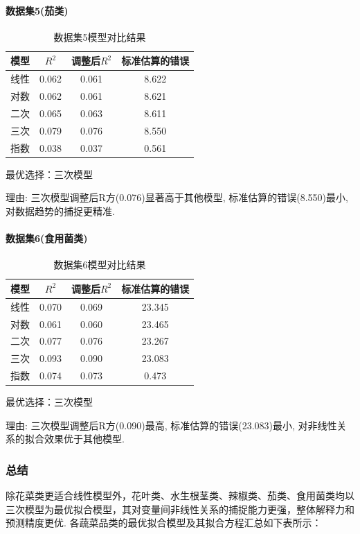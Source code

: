 \documentclass{cumcmthesis}
\begin{document}
\paragraph{数据集5(茄类)}
\begin{table}[H]
\centering
\begin{tabular}{cccc}
\hline
模型 & $R^2$ & 调整后$R^2$ & 标准估算的错误 \\
\hline
线性 & 0.062 & 0.061 & 8.622 \\
对数 & 0.062 & 0.061 & 8.621 \\
二次 & 0.065 & 0.063 & 8.611 \\
三次 & 0.079 & 0.076 & 8.550 \\
指数 & 0.038 & 0.037 & 0.561 \\
\hline
\end{tabular}
\caption{数据集5模型对比结果}
\label{tab:dataset5}
\end{table}

最优选择：三次模型

理由: 三次模型调整后R方(0.076)显著高于其他模型, 标准估算的错误(8.550)最小, 对数据趋势的捕捉更精准. 


\paragraph{数据集6(食用菌类)}
\begin{table}[H]
\centering
\begin{tabular}{cccc}
\hline
模型 & $R^2$ & 调整后$R^2$ & 标准估算的错误 \\
\hline
线性 & 0.070 & 0.069 & 23.345 \\
对数 & 0.061 & 0.060 & 23.465 \\
二次 & 0.077 & 0.076 & 23.267 \\
三次 & 0.093 & 0.090 & 23.083 \\
指数 & 0.074 & 0.073 & 0.473 \\
\hline
\end{tabular}
\caption{数据集6模型对比结果}
\label{tab:dataset6}
\end{table}

最优选择：三次模型

理由: 三次模型调整后R方(0.090)最高, 标准估算的错误(23.083)最小, 对非线性关系的拟合效果优于其他模型. 


\subsubsection{总结}
除花菜类更适合线性模型外，花叶类、水生根茎类、辣椒类、茄类、食用菌类均以
三次模型为最优拟合模型，其对变量间非线性关系的捕捉能力更强，整体解释力和预测精度更优. 
各蔬菜品类的最优拟合模型及其拟合方程汇总如下表所示：
\end{document}
